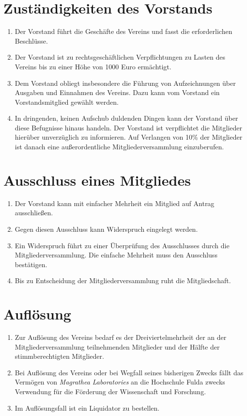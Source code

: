 \documentclass[ngerman]{article}
\begin{document}
\section{Zuständigkeiten des Vorstands}
\begin{enumerate}
\item Der Vorstand führt die Geschäfte des Vereins und fasst die erforderlichen Beschlüsse.
\item Der Vorstand ist zu rechtsgeschäftlichen Verpflichtungen zu Lasten des Vereins bis zu einer Höhe von 1000 Euro ermächtigt.
\item Dem Vorstand obliegt insbesondere die Führung von Aufzeichnungen über Ausgaben und Einnahmen des Vereins. Dazu kann vom Vorstand ein Vorstandsmitglied gewählt werden.
\item In dringenden, keinen Aufschub duldenden Dingen kann der Vorstand über diese Befugnisse hinaus handeln. Der Vorstand ist verpflichtet
die Mitglieder hierüber unverzüglich zu informieren. Auf Verlangen von 10\% der Mitglieder ist danach eine außerordentliche Mitgliederversammlung einzuberufen.
\end{enumerate}

\section{Ausschluss eines Mitgliedes}
\begin{enumerate}
\item Der Vorstand kann mit einfacher Mehrheit ein Mitglied auf Antrag ausschließen.
\item Gegen diesen Ausschluss kann Widerspruch eingelegt werden.
\item Ein Widerspruch führt zu einer Überprüfung des Ausschlusses durch die Mitgliederversammlung. Die einfache Mehrheit muss den Ausschluss
bestätigen.
\item Bis zu Entscheidung der Mitgliederversammlung ruht die Mitgliedschaft.
\end{enumerate}

\section{Auflösung}
\begin{enumerate}
\item Zur Auflösung des Vereins bedarf es der Dreiviertelmehrheit der an der Mitgliederversammlung teilnehmenden Mitglieder und der Hälfte
der stimmberechtigten Mitglieder.
\item Bei Auflösung des Vereins oder bei Wegfall seines bisherigen Zwecks fällt das Vermögen von \emph{Magrathea Laboratories} an die Hochschule Fulda zwecks
Verwendung für die Förderung der Wissenschaft und Forschung.
\item Im Auflösungsfall ist ein Liquidator zu bestellen.
\end{enumerate}
\end{document}
